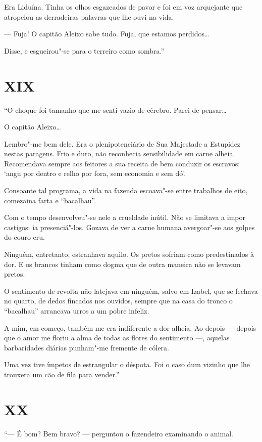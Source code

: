 Era Liduína. Tinha os olhos esgazeados de pavor e foi em voz arquejante
que atropelou as derradeiras palavras que lhe ouvi na vida.

--- Fuja! O capitão Aleixo sabe tudo. Fuja, que estamos perdidos\ldots{}

Disse, e esgueirou"-se para o terreiro como sombra.''

\section*{XIX}

``O choque foi tamanho que me senti vazio de cérebro. Parei de pensar\ldots{}

O capitão Aleixo\ldots{}

Lembro"-me bem dele. Era o plenipotenciário de Sua Majestade a Estupidez
nestas paragens. Frio e duro, não reconhecia sensibilidade em carne
alheia. Recomendava sempre aos feitores a sua receita de bem conduzir os
escravos: `angu por dentro e relho por fora, sem economia e sem dó'.

Consoante tal programa, a vida na fazenda escoava"-se entre trabalhos de
eito, comezaina farta e ``bacalhau''.

Com o tempo desenvolveu"-se nele a crueldade inútil. Não se limitava a
impor castigos: ia presenciá"-los. Gozava de ver a carne humana
avergoar"-se aos golpes do couro cru.

Ninguém, entretanto, estranhava aquilo. Os pretos sofriam como
predestinados à dor. E os brancos tinham como dogma que de outra maneira
não se levavam pretos.

O sentimento de revolta não latejava em ninguém, salvo em Izabel, que se
fechava no quarto, de dedos fincados nos ouvidos, sempre que na casa do
tronco o ``bacalhau'' arrancava urros a um pobre infeliz.

A mim, em começo, também me era indiferente a dor alheia. Ao depois ---
depois que o amor me floriu a alma de todas as flores do sentimento ---,
aquelas barbaridades diárias punham"-me fremente de cólera.

Uma vez tive ímpetos de estrangular o déspota. Foi o caso dum vizinho
que lhe trouxera um cão de fila para vender.''

\section*{XX}

``--- É bom? Bem bravo? --- perguntou o fazendeiro examinando o animal.

